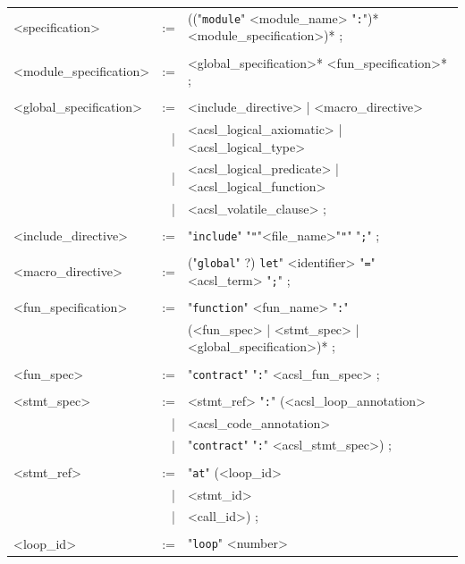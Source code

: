 \documentclass{frama-c-book}
\begin{document}
\begin{table}[!ht]
\begin{center}
\begin{tabular}{|lrl|}
\hline
<specification> & := & (("{\tt\/module}" <module\_name> "\verb+:+")* <module\_specification>)* ;\\
           &    &\\
<module\_specification> & := &  <global\_specification>* <fun\_specification>* ;\\
           &    &\\
<global\_specification> & := & <include\_directive> | <macro\_directive>\\
           &  | & <acsl\_logical\_axiomatic> | <acsl\_logical\_type>\\
           &  | & <acsl\_logical\_predicate> | <acsl\_logical\_function>\\
           &  | & <acsl\_volatile\_clause> ;\\
           &    &\\
<include\_directive> & := & "\verb+include+" "\verb+"+"<file\_name>"\verb+"+" "\verb+;+" ;\\
           &    &\\
<macro\_directive> & := & ("\verb+global+" ?) \verb+let+" <identifier> "\verb+=+" <acsl\_term> "\verb+;+" ; \\
           &    &\\
<fun\_specification> & := & "{\tt\/function}" <fun\_name> "\verb+:+"\\
           &    & (<fun\_spec> | <stmt\_spec> | <global\_specification>)* ;\\
           &    &\\
<fun\_spec> & := & "{\tt\/contract}" "\verb+:+" <acsl\_fun\_spec> ;\\
           &    &\\
<stmt\_spec> & := & <stmt\_ref> "\verb+:+" (<acsl\_loop\_annotation>\\
           &  | &  <acsl\_code\_annotation>\\
           &  | &  "{\tt\/contract}" "\verb+:+" <acsl\_stmt\_spec>) ;\\
           &    &\\
<stmt\_ref> & := & "{\tt\/at}" (<loop\_id>\\
           &  | & <stmt\_id>  \\
           &  | & <call\_id>) ;\\
           &    &\\
<loop\_id>  & := & "{\tt\/loop}" <number> \\

\end{tabular}
\end{center}
\end{table}
\end{document}
